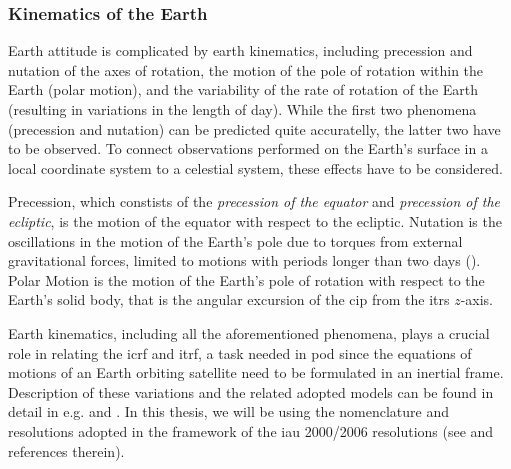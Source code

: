 \subsubsection{Kinematics of the Earth}\label{sssec:earth-attitude}

Earth attitude is complicated by earth kinematics, including precession and nutation 
of the axes of rotation, the motion of the pole of rotation within the Earth (polar 
motion), and the variability of the rate of rotation of the Earth (resulting in variations 
in the length of day). While the first two phenomena (precession and nutation) can be 
predicted quite accuratelly, the latter two have to be observed. To connect observations 
performed on the Earth's surface in a local coordinate system to a celestial system, 
these effects have to be considered.

Precession, which constists of the \emph{precession of the equator} and 
\emph{precession of the ecliptic}, is the motion of the equator with respect to 
the ecliptic. Nutation is the oscillations in the motion of the Earth's pole due 
to torques from external gravitational forces, limited to motions with periods longer 
than two days (\cite{Gurfil18}). Polar Motion is the motion of the Earth's pole of 
rotation with respect to the Earth's solid body, that is the angular excursion of 
the \gls{cip} from the \gls{itrs} $z$-axis.

Earth kinematics, including all the aforementioned phenomena, plays a crucial role in 
relating the \gls{icrf} and \gls{itrf}, a task needed in \gls{pod} since the equations 
of motions of an Earth orbiting satellite need to be formulated in an inertial frame.
Description of these variations and the related adopted models can be found in detail 
in e.g. \cite{Gurfil18} and \cite{Urban2013}. In this thesis, we will be using the 
nomenclature and resolutions adopted in the framework of the \gls{iau} 2000/2006 resolutions 
(see \cite{iers2010} and references therein).